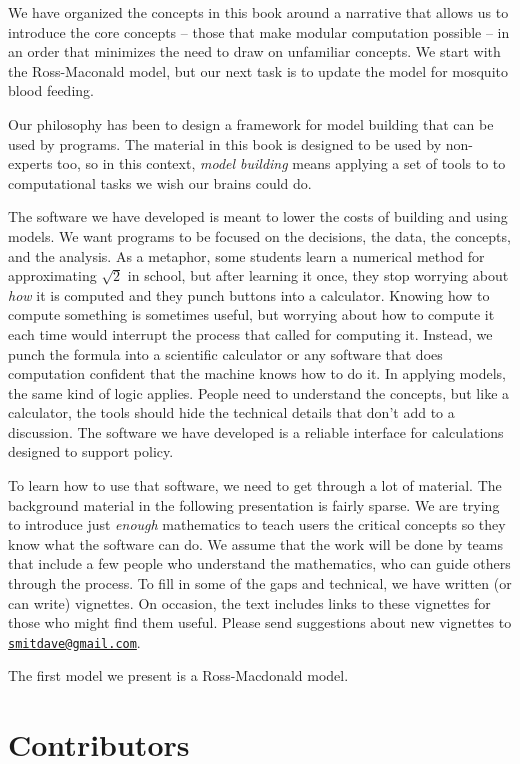 \documentclass[
]{book}
\begin{document}
We have organized the concepts in this book around a narrative that allows us to introduce the core concepts -- those that make modular computation possible -- in an order that minimizes the need to draw on unfamiliar concepts. We start with the Ross-Maconald model, but our next task is to update the model for mosquito blood feeding.

Our philosophy has been to design a framework for model building that can be used by programs. The material in this book is designed to be used by non-experts too, so in this context, \emph{model building} means applying a set of tools to to computational tasks we wish our brains could do.

The software we have developed is meant to lower the costs of building and using models. We want programs to be focused on the decisions, the data, the concepts, and the analysis. As a metaphor, some students learn a numerical method for approximating \(\sqrt{2}\) in school, but after learning it once, they stop worrying about \emph{how} it is computed and they punch buttons into a calculator. Knowing how to compute something is sometimes useful, but worrying about how to compute it each time would interrupt the process that called for computing it. Instead, we punch the formula into a scientific calculator or any software that does computation confident that the machine knows how to do it. In applying models, the same kind of logic applies. People need to understand the concepts, but like a calculator, the tools should hide the technical details that don't add to a discussion. The software we have developed is a reliable interface for calculations designed to support policy.

To learn how to use that software, we need to get through a lot of material. The background material in the following presentation is fairly sparse. We are trying to introduce just \emph{enough} mathematics to teach users the critical concepts so they know what the software can do. We assume that the work will be done by teams that include a few people who understand the mathematics, who can guide others through the process. To fill in some of the gaps and technical, we have written (or can write) vignettes. On occasion, the text includes links to these vignettes for those who might find them useful. Please send suggestions about new vignettes to \href{mailto:smitdave@gmail.com}{\nolinkurl{smitdave@gmail.com}}.

The first model we present is a Ross-Macdonald model.

\hypertarget{contributors}{%
\section*{Contributors}\label{contributors}}
\end{document}
